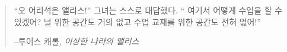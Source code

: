 
\newpage \vspace*{8cm}
\thispagestyle{empty}
\begin{quotation}
	\begin{center}
		\large
		\enquote{오 어리석은 앨리스!} 그녀는 스스로 대답했다. \enquote{
			여기서 어떻게 수업을 할 수 있겠어? 널 위한 공간도 거의 없고 수업 교재를 위한 공간도 전혀 없어!}
	\end{center}
	\begin{flushright} --루이스 캐롤, \textit{이상한 나라의 앨리스}\end{flushright}
\end{quotation}
